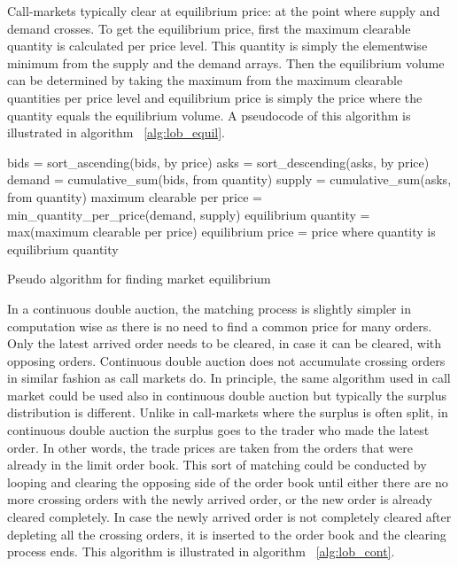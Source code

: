 Call-markets typically clear at equilibrium price: at the point where
supply and demand crosses. 
To get the equilibrium price, first the maximum clearable quantity
is calculated per price level. This quantity is simply the elementwise
minimum from the supply and the demand arrays. Then the equilibrium volume
can be determined by taking the maximum from the maximum clearable quantities
per price level and equilibrium price is simply the price where the quantity
equals the equilibrium volume. A pseudocode of this algorithm is illustrated in 
algorithm ~\ref{alg:lob_equil}.

\begin{algorithm}[H]
    \SetAlgoLined
    \DontPrintSemicolon
    
    bids = sort\_ascending(bids, by price)\;
    asks = sort\_descending(asks, by price)\;
    \;
    demand = cumulative\_sum(bids, from quantity)\;
    supply = cumulative\_sum(asks, from quantity)\;
    \;
    maximum clearable per price = min\_quantity\_per\_price(demand, supply)\;
    \;
    equilibrium quantity = max(maximum clearable per price)\;
    equilibrium price = price where quantity is equilibrium quantity\;
    \caption{Pseudo algorithm for finding market equilibrium}
    \label{alg:lob_equil}
\end{algorithm}


In a continuous double auction, the matching process is slightly simpler in computation
wise as there is no need to find a common price for many orders. Only the latest arrived
order needs to be cleared, in case it can be cleared, with opposing orders. Continuous
double auction does not accumulate crossing orders in similar fashion as call markets do. 
In principle, the same algorithm used in call market could be used also in continuous double auction 
but typically the surplus distribution is different. Unlike in call-markets where the surplus is often
split, in continuous double auction the surplus goes to the trader who made the latest order.
In other words, the trade prices are taken from the orders that were already in the limit order book.
This sort of matching could be conducted by looping and clearing the opposing side of the order book until either
there are no more crossing orders with the newly arrived order, or the new order is already cleared
completely. In case the newly arrived order is not completely cleared after depleting all the crossing
orders, it is inserted to the order book and the clearing process ends. This algorithm is illustrated in
algorithm ~\ref{alg:lob_cont}. 

